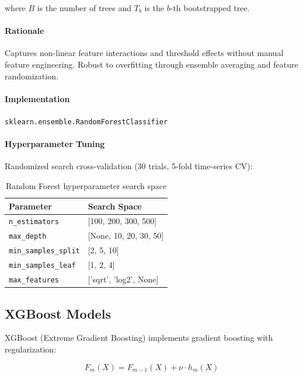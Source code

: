 \documentclass{report}
\begin{document}
where $B$ is the number of trees and $T_b$ is the $b$-th bootstrapped tree.

\paragraph{Rationale}

Captures non-linear feature interactions and threshold effects without manual feature engineering. Robust to overfitting through ensemble averaging and feature randomization.

\paragraph{Implementation}

\texttt{sklearn.ensemble.RandomForestClassifier}

\paragraph{Hyperparameter Tuning}

Randomized search cross-validation (30 trials, 5-fold time-series CV):

\begin{table}[h]
\centering
\caption{Random Forest hyperparameter search space}
\label{tab:rf_hyperparams}
\begin{tabular}{ll}
\toprule
\textbf{Parameter} & \textbf{Search Space} \\
\midrule
\texttt{n\_estimators} & [100, 200, 300, 500] \\
\texttt{max\_depth} & [None, 10, 20, 30, 50] \\
\texttt{min\_samples\_split} & [2, 5, 10] \\
\texttt{min\_samples\_leaf} & [1, 2, 4] \\
\texttt{max\_features} & ['sqrt', 'log2', None] \\
\bottomrule
\end{tabular}
\end{table}

\subsection{XGBoost Models}
\label{sec:xgboost}

XGBoost (Extreme Gradient Boosting) implements gradient boosting with regularization:

\begin{equation}
F_m(X) = F_{m-1}(X) + \nu \cdot h_m(X)
\end{equation}
\end{document}
